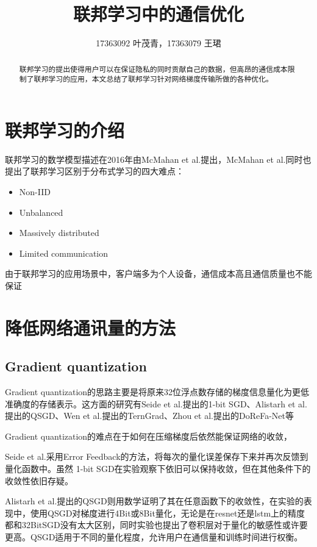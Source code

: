\documentclass[11pt,onecolumn,letterpaper]{article}
\begin{document}
    \title{联邦学习中的通信优化}
    \author{17363092 叶茂青，17363079 王珺}

    \maketitle
    \begin{abstract}
        联邦学习的提出使得用户可以在保证隐私的同时贡献自己的数据，但高昂的通信成本限制了联邦学习的应用，本文总结了联邦学习针对网络梯度传输所做的各种优化。
    \end{abstract}

    \section{联邦学习的介绍}
    联邦学习的数学模型描述在2016年由McMahan et al.\cite{McMahan2016}提出，McMahan et al.同时也提出了联邦学习区别于分布式学习的四大难点：
    \begin{itemize}
        \item Non-IID
        \item Unbalanced
        \item Massively distributed
        \item Limited communication
    \end{itemize}
    由于联邦学习的应用场景中，客户端多为个人设备，通信成本高且通信质量也不能保证


    \section{降低网络通讯量的方法}

    \subsection{Gradient quantization}
    Gradient quantization的思路主要是将原来32位浮点数存储的梯度信息量化为更低准确度的存储表示。这方面的研究有Seide et al.\cite{Seide2014}提出的1-bit SGD、Alistarh et al.\cite{Alistarh}提出的QSGD、Wen et al.\cite{Wen}提出的TernGrad、Zhou et al.\cite{Zhou}提出的DoReFa-Net等
    
    Gradient quantization的难点在于如何在压缩梯度后依然能保证网络的收敛，

    Seide et al.\cite{Seide2014}采用Error Feedback的方法，将每次的量化误差保存下来并再次反馈到量化函数中。虽然 1-bit SGD在实验观察下依旧可以保持收敛，但在其他条件下的收敛性依旧存疑。
    
    Alistarh et al.\cite{Alistarh}提出的QSGD则用数学证明了其在任意函数下的收敛性，在实验的表现中，使用QSGD对梯度进行4Bit或8Bit量化，无论是在resnet还是lstm上的精度都和32BitSGD没有太大区别，同时实验也提出了卷积层对于量化的敏感性或许要更高。QSGD适用于不同的量化程度，允许用户在通信量和训练时间进行权衡。
\end{document}
